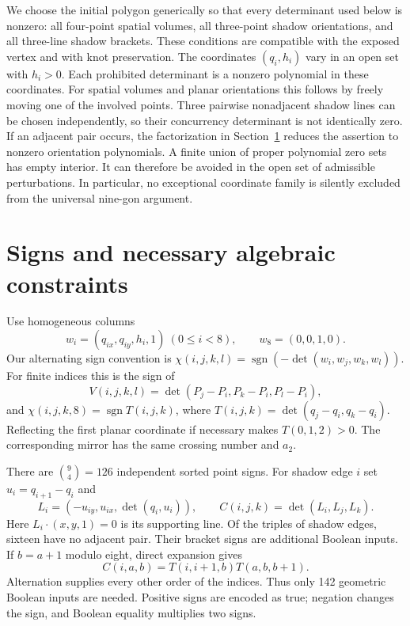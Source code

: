 \documentclass[11pt]{article}
\newcommand{\sgn}{\operatorname{sgn}}
\begin{document}
We choose the initial polygon generically so that every determinant used
below is nonzero: all four-point spatial volumes, all three-point shadow
orientations, and all three-line shadow brackets. These conditions are
compatible with the exposed vertex and with knot preservation.
The coordinates $(q_i,h_i)$ vary in an open set with $h_i>0$.
Each prohibited determinant is a nonzero polynomial in these coordinates.
For spatial volumes and planar orientations this follows by freely
moving one of the involved points. Three pairwise nonadjacent shadow
lines can be chosen independently, so their concurrency determinant
is not identically zero. If an adjacent pair occurs, the factorization
in Section~\ref{sec:signs} reduces the assertion to nonzero orientation
polynomials. A finite union of proper polynomial zero sets has empty
interior. It can therefore be avoided in the open set of admissible
perturbations. In particular, no exceptional coordinate family is
silently excluded from the universal nine-gon argument.

\section{Signs and necessary algebraic constraints}\label{sec:signs}
Use homogeneous columns
\[
 w_i=(q_{ix},q_{iy},h_i,1)\ (0\leq i<8),\qquad w_8=(0,0,1,0).
\]
Our alternating sign convention is
$\chi(i,j,k,l)=\sgn(-\det(w_i,w_j,w_k,w_l))$.
For finite indices this is the sign of
\[
 V(i,j,k,l)=\det(P_j-P_i,P_k-P_i,P_l-P_i),
\]
and $\chi(i,j,k,8)=\sgn T(i,j,k)$, where
$T(i,j,k)=\det(q_j-q_i,q_k-q_i)$.
Reflecting the first planar coordinate if necessary makes $T(0,1,2)>0$.
The corresponding mirror has the same crossing number and $a_2$.

There are $\binom94=126$ independent sorted point signs. For shadow edge
$i$ set $u_i=q_{i+1}-q_i$ and
\[
 L_i=(-u_{iy},u_{ix},\det(q_i,u_i)),\qquad
 C(i,j,k)=\det(L_i,L_j,L_k).
\]
Here $L_i\cdot(x,y,1)=0$ is its supporting line. Of the triples of
shadow edges, sixteen have no adjacent pair. Their bracket signs are
additional Boolean inputs. If $b=a+1$ modulo eight, direct expansion gives
\begin{equation}\label{eq:adjacent}
 C(i,a,b)=T(i,i+1,b)T(a,b,b+1).
\end{equation}
Alternation supplies every other order of the indices. Thus only 142
geometric Boolean inputs are needed. Positive signs are encoded as true;
negation changes the sign, and Boolean equality multiplies two signs.
\end{document}
